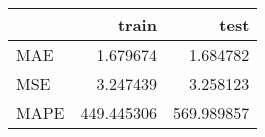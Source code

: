 \begin{tabular}{lrr}
\toprule
{} &       train &        test \\
\midrule
MAE  &    1.679674 &    1.684782 \\
MSE  &    3.247439 &    3.258123 \\
MAPE &  449.445306 &  569.989857 \\
\bottomrule
\end{tabular}
